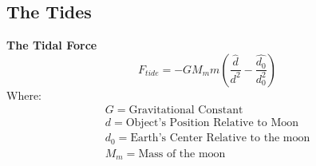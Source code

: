 \documentclass[11pt]{article}
\theoremstyle{definition}
\begin{document}
\subsection{The Tides}
\begin{shaded}
\textbf{The Tidal Force} \newline
\begin{equation}
F_{tide} = -GM_mm(\frac{\hat{d}}{d^2}-\frac{\hat{d_0}}{d_0^2})
\end{equation}
Where:
\begin{equation*}
\begin{split}
G = \text{Gravitational Constant} \\
d = \text{Object's Position Relative to Moon} \\
d_0 = \text{Earth's Center Relative to the moon}\\
M_m = \text{Mass of the moon}
\end{split}
\end{equation*}
\end{shaded}
\end{document}
